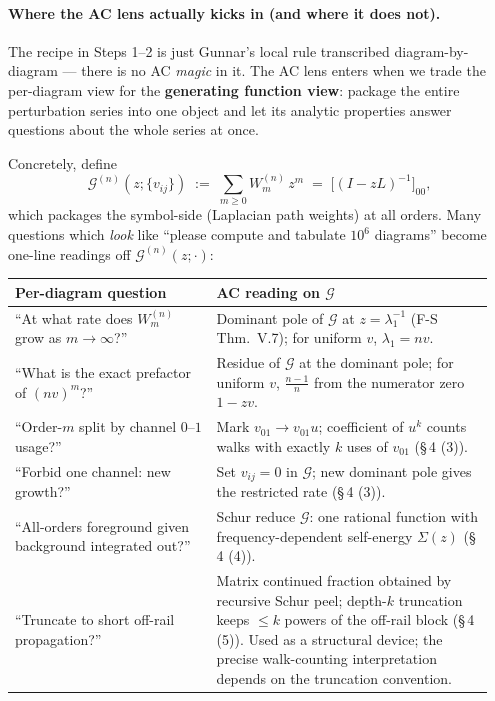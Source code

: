\documentclass[11pt,a4paper]{article}
\begin{document}
\paragraph{Where the AC lens actually kicks in (and where it does not).}
The recipe in Steps 1--2 is just Gunnar's local rule transcribed
diagram-by-diagram --- there is no AC \emph{magic} in it. The AC lens
enters when we trade the per-diagram view for the
\textbf{generating function view}: package the entire perturbation series
into one object and let its analytic properties answer questions about
the whole series at once.

\smallskip
Concretely, define
\[
\mathcal G^{(n)}(z;\{v_{ij}\}) \;:=\; \sum_{m\geq 0} W^{(n)}_{m}\, z^{m}
\;=\; \big[(I - zL)^{-1}\big]_{00},
\]
which packages the symbol-side (Laplacian path weights) at all orders.
Many questions which \emph{look} like ``please compute and tabulate
$10^{6}$ diagrams'' become one-line readings off
$\mathcal G^{(n)}(z;\cdot)$:

\begin{commentbox}[title=Translation table: per-diagram question $\;\Longleftrightarrow\;$ AC reading]
\renewcommand{\arraystretch}{1.1}
\begin{tabular}{p{0.40\linewidth}p{0.55\linewidth}}
\toprule
\textbf{Per-diagram question} & \textbf{AC reading on $\mathcal G$} \\
\midrule
``At what rate does $W^{(n)}_{m}$ grow as $m\!\to\!\infty$?'' &
Dominant pole of $\mathcal G$ at $z=\lambda_{1}^{-1}$ (F-S Thm.~V.7);
for uniform $v$, $\lambda_{1}=nv$. \\
``What is the exact prefactor of $(nv)^{m}$?'' &
Residue of $\mathcal G$ at the dominant pole; for uniform $v$,
$\tfrac{n-1}{n}$ from the numerator zero $1{-}zv$. \\
``Order-$m$ split by channel $0$--$1$ usage?'' &
Mark $v_{01}\!\to\!v_{01}u$; coefficient of $u^{k}$ counts walks with
exactly $k$ uses of $v_{01}$ (\S\,4 (3)). \\
``Forbid one channel: new growth?'' &
Set $v_{ij}{=}0$ in $\mathcal G$; new dominant pole gives the
restricted rate (\S\,4 (3)). \\
``All-orders foreground given background integrated out?'' &
Schur reduce $\mathcal G$: one rational function with
frequency-dependent self-energy $\Sigma(z)$ (\S\,4 (4)). \\
``Truncate to short off-rail propagation?'' &
Matrix continued fraction obtained by recursive Schur peel; depth-$k$
truncation keeps $\leq k$ powers of the off-rail block (\S\,4 (5)).
Used as a structural device; the precise walk-counting interpretation
depends on the truncation convention. \\
\bottomrule
\end{tabular}
\end{commentbox}
\end{document}
